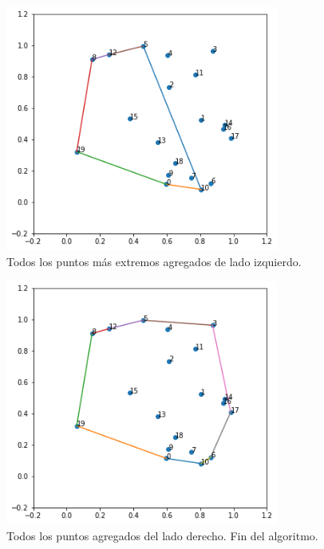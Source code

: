 \documentclass[paper=leter, fontsize=11pt]{scrartcl}
\numberwithin{equation}{section}		%
\numberwithin{figure}{section}			%
\numberwithin{table}{section}				%
\begin{document}
\begin{figure}
    \centering
    \includegraphics[width=0.8\textwidth]{5.png}
    \caption{Todos los puntos más extremos agregados de lado izquierdo.}
    \label{5}
\end{figure}

\begin{figure}
    \centering
    \includegraphics[width=0.8\textwidth]{8.png}
    \caption{Todos los puntos agregados del lado derecho. Fin del algoritmo.}
    \label{8}
\end{figure}



\end{document}
